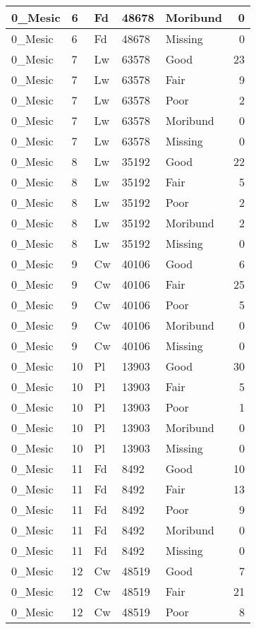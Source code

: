 \documentclass[
]{article}
\begin{document}
\begin{tabular}{l|l|l|l|l|r}
\hline
0\_Mesic & 6 & Fd & 48678 & Moribund & 0\\
\hline
0\_Mesic & 6 & Fd & 48678 & Missing & 0\\
\hline
0\_Mesic & 7 & Lw & 63578 & Good & 23\\
\hline
0\_Mesic & 7 & Lw & 63578 & Fair & 9\\
\hline
0\_Mesic & 7 & Lw & 63578 & Poor & 2\\
\hline
0\_Mesic & 7 & Lw & 63578 & Moribund & 0\\
\hline
0\_Mesic & 7 & Lw & 63578 & Missing & 0\\
\hline
0\_Mesic & 8 & Lw & 35192 & Good & 22\\
\hline
0\_Mesic & 8 & Lw & 35192 & Fair & 5\\
\hline
0\_Mesic & 8 & Lw & 35192 & Poor & 2\\
\hline
0\_Mesic & 8 & Lw & 35192 & Moribund & 2\\
\hline
0\_Mesic & 8 & Lw & 35192 & Missing & 0\\
\hline
0\_Mesic & 9 & Cw & 40106 & Good & 6\\
\hline
0\_Mesic & 9 & Cw & 40106 & Fair & 25\\
\hline
0\_Mesic & 9 & Cw & 40106 & Poor & 5\\
\hline
0\_Mesic & 9 & Cw & 40106 & Moribund & 0\\
\hline
0\_Mesic & 9 & Cw & 40106 & Missing & 0\\
\hline
0\_Mesic & 10 & Pl & 13903 & Good & 30\\
\hline
0\_Mesic & 10 & Pl & 13903 & Fair & 5\\
\hline
0\_Mesic & 10 & Pl & 13903 & Poor & 1\\
\hline
0\_Mesic & 10 & Pl & 13903 & Moribund & 0\\
\hline
0\_Mesic & 10 & Pl & 13903 & Missing & 0\\
\hline
0\_Mesic & 11 & Fd & 8492 & Good & 10\\
\hline
0\_Mesic & 11 & Fd & 8492 & Fair & 13\\
\hline
0\_Mesic & 11 & Fd & 8492 & Poor & 9\\
\hline
0\_Mesic & 11 & Fd & 8492 & Moribund & 0\\
\hline
0\_Mesic & 11 & Fd & 8492 & Missing & 0\\
\hline
0\_Mesic & 12 & Cw & 48519 & Good & 7\\
\hline
0\_Mesic & 12 & Cw & 48519 & Fair & 21\\
\hline
0\_Mesic & 12 & Cw & 48519 & Poor & 8\\

\end{tabular}
\end{document}

